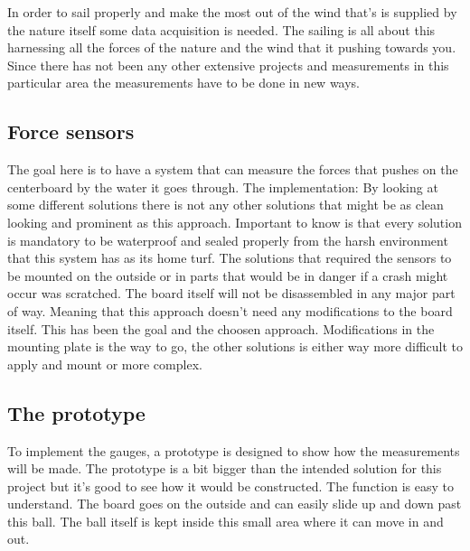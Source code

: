 
In order to sail properly and make the most out of the wind that’s is supplied by the nature itself some data acquisition is needed. The sailing is all about this harnessing all the forces of the nature and the wind that it pushing towards you. Since there has not been any other extensive projects and measurements in this particular area the measurements have to be done in new ways. 

\subsection{Force sensors}

The goal here is to have a system that can measure the forces that pushes on the centerboard by the water it goes through. 
The implementation:
By looking at some different solutions there is not any other solutions that might be as clean looking and prominent as this approach. Important to know is that every solution is mandatory to be waterproof and sealed properly from the harsh environment that this system has as its home turf. The solutions that required the sensors to be mounted on the outside or in parts that would be in danger if a crash might occur was scratched.  
The board itself will not be disassembled in any major part of way. Meaning that this approach doesn’t need any modifications to the board itself. This has been the goal and the choosen approach. Modifications in the mounting plate is the way to go, the other solutions is either way more difficult to apply and mount or more complex.

\subsection{The prototype}
To implement the gauges, a prototype is designed to show how the measurements will be made. The prototype is a bit bigger than the intended solution for this project but it's good to see how it would be constructed. The function is easy to understand. The board goes on the outside and can easily slide up and down past this ball.  The ball itself is kept inside this small area where it can move in and out.
 
